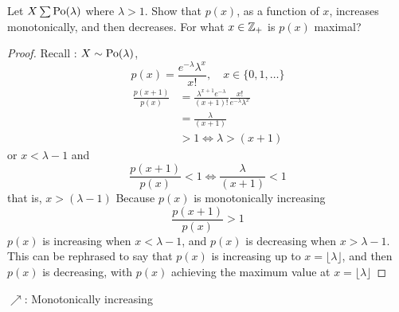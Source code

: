 \documentclass[10pt, a4paper]{article}
\begin{document}
\begin{problem}[100]
    Let $X \sum \operatorname{Po}(\lambda)$ where $\lambda > 1$.
    Show that $p(x)$,
    as a function of $x$,
    increases monotonically,
    and then decreases.
    For what $x \in \mathbb{Z}_+$ is $p(x)$ maximal?
    \begin{proof}
        Recall : $X \sim \operatorname{Po}(\lambda)$,
        \[
        p(x) = \frac{e ^ {-\lambda}\lambda ^ x}{x!},\quad x \in \{0, 1, \dotsc\}
        \]
        \begin{align*}
            \frac{p(x + 1)}{p(x)} &= \frac{\lambda ^ {x + 1} e ^ {-\lambda}}{(x + 1)!} \frac{x!}{e ^ {-\lambda} \lambda ^ x} \\
            &= \frac{\lambda}{(x + 1)} \\
            &> 1 \iff \lambda > (x + 1)
        \end{align*}
        or $x < \lambda - 1$ and
        \[
        \frac{p(x + 1)}{p(x)} < 1 \iff \frac{\lambda}{(x + 1)} < 1
        \]
        that is,
        $x > (\lambda - 1)$
        Because $p(x)$ is monotonically increasing
        \[
        \frac{p(x + 1)}{p(x)} > 1
        \]
        $p(x)$ is increasing when $x < \lambda - 1$,
        and $p(x)$ is decreasing when $x > \lambda - 1$.
        This can be rephrased to say that $p(x)$ is increasing up to $x = \lfloor\lambda\rfloor$,
        and then $p(x)$ is decreasing,
        with $p(x)$ achieving the maximum value at $x = \lfloor\lambda\rfloor$
    \end{proof}
\end{problem}

$\nearrow$: Monotonically increasing
\end{document}
